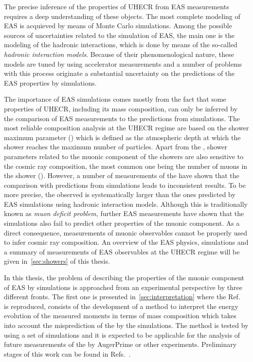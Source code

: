 The precise inference of the properties of UHECR
from EAS measurements requires a deep understanding
of these objects. The most complete modeling of EAS is
acquieved by means of Monte Carlo simulations.
Among the possible sources of uncertainties related to the
simulation of EAS, the main one is the modeling
of the hadronic interactions, which is done
by means of the so-called \emph{hadronic interaction models}. 
Because of their phenomenological nature,
these models are tuned by using accelerator measurements
and a number of problems with this process originate a substantial
uncertainty on the predictions of the EAS properties by simulations.

The importance of EAS simulations comes mostly from the fact that
some properties of UHECR, including its mass composition,
can only be inferred by the comparison of EAS measurements
to the predictions from simulations.
The most reliable composition analysis at the UHECR regime
are based on the shower maximum parameter (\xmax) which is defined
as the atmospheric depth at which the shower reaches the maximum
number of particles. Apart from the \xmax, shower parameters related
to the muonic component of the showers are also sensitive to
the cosmic ray composition, the most common one being the number
of muons in the shower (\nmu). However, a number of measurements of the \nmu
have shown that the comparison with predictions from simulations leads
to inconsistent results. To be more precise, the \nmu observed is systematically
larger than the ones predicted by EAS simulations using hadronic interaction
models. Although this is traditionally known as \emph{muon deficit problem},
further EAS measurements have shown
that the simulations also fail to predict other properties of the muonic component.
As a direct consequence, measurements of muonic observables cannot be
properly used to infer cosmic ray composition.  
An overview of the EAS physics, simulations and a summary of measurements
of EAS observables at the UHECR regime will be given in~\cref{sec:showers}
of this thesis. \newline

In this thesis, the problem of describing the properties of the muonic component of EAS
by simulations is approached from an experimental perspective by three different fronts.
The first one is presented in~\cref{sec:interpretation}
where the Ref.~\cite{Prado:2016akv} is reproduced,
consists of the development of a method to interpret the energy evolution
of the measured \nmu moments in terms of mass composition which takes into account
the misprediction of the \nmu by the simulations. The method is tested by using
a set of simulations and it is expected to be applicable for the analysis
of future measurements of the \nmu by AugerPrime or other experiments.
Preliminary stages of this work can be found in Refs.~\cite{Prado:2015iaz,GAP2014,GAP2015}.

